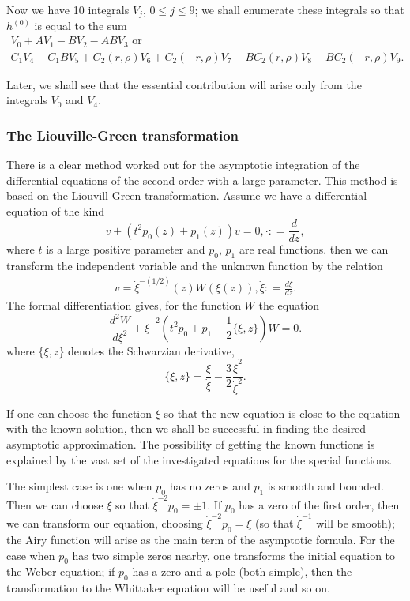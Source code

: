 Now we have 10 integrals $V_j$, $0 \leqslant j \leqslant 9$; we shall enumerate these integrals so that $h^{(0)}$ is equal to the sum
\begin{gather*}
V_0 + A V_1 - B V_2 - ABV_3 \text{ or } \\
C_1 V_4 -C_1 B V_5 + C_2 (r, \rho) V_6 + C_2 (-r, \rho) V_7 -B C_2 (r, \rho) V_8 - B C_2 (-r, \rho) V_9.
\end{gather*}

Later, \pageoriginale we shall see that the essential contribution will arise only from the integrals $V_0$ and $V_4$.

\setcounter{section}{2}
\subsubsection{The Liouville-Green transformation}\label{art7-subsubsec2.6.2}
There is a clear method worked out for the asymptotic integration of the differential equations of the second order with a large parameter. This method is based on the Liouvill-Green transformation. Assume we have a differential equation of the kind 
\setcounter{section}{7}
\setcounter{equation}{12}
\begin{equation}
v + (t^2 p_0 (z)+ p_1 (z)) v =0, \cdot : = \frac{d}{dz}, \label{art7-eq7.13}
\end{equation}
where $t$ is a large positive parameter and $p_0$, $p_1$ are real functions. then we can transform the independent variable and the unknown function by the relation
\begin{align}
v = \dot{\xi}^{-(1/2)} (z) W(\xi(z)), \dot{\xi} : = \frac{d\xi}{dz}. \label{art7-eq7.14}
\end{align}
The formal differentiation gives, for the function $W$ the equation
\begin{equation}
\frac{d^2 W}{d\xi^2} + \dot{\xi}^{-2} (t^2 p_0 + p_1 - \frac{1}{2} \{\xi, z\})  W = 0.\label{art7-eq7.15} 
\end{equation}
where $\{\xi, z\}$ denotes the Schwarzian derivative, 
$$
\{\xi,z\} = \frac{\dddot{\xi}}{\dot{\xi}}- \frac{3}{2} \frac{\ddot{\xi}^2}{\dot{\xi}^2}.
$$

If one can choose the function $\xi$ so that the new equation is close to the equation with the known solution, then we shall be successful in finding the desired asymptotic approximation. The possibility of getting the known functions is explained by the vast set of the investigated equations for the special functions.

The simplest case is one when $p_0$ has no zeros and $p_1$ is smooth and bounded. Then we can choose $\xi$ so that $\dot{\xi}^{-2}p_0 = \pm 1$. If $p_0$ has a zero of the first order, then we can transform our equation, choosing $\dot{\xi}^{-2} p_0 = \xi$ (so that $\dot{\xi}^{-1}$ will be smooth); the Airy function will arise as the main term of the asymptotic formula. For the case when $p_0$ has two simple zeros nearby, one transforms the initial equation to the Weber equation; if $p_0$ has a zero and a pole (both simple), then the transformation to the Whittaker equation will be useful and so on. 


